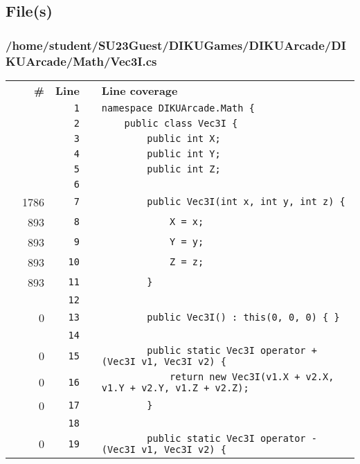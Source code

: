 \documentclass[a4paper,landscape,10pt]{article}
\begin{document}
\subsection{File(s)}
\subsubsection{/home/student/SU23Guest/DIKUGames/DIKUArcade/DIKUArcade/Math/Vec3I.cs}
\begin{longtable}[l]{lrrll}
\textbf{} & \textbf{\#} & \textbf{Line} & \textbf{} & \textbf{Line coverage}\\
\cellcolor{gray} &  & \verb~1~ & & \verb~namespace DIKUArcade.Math {~\\
\cellcolor{gray} &  & \verb~2~ & & \verb~    public class Vec3I {~\\
\cellcolor{gray} &  & \verb~3~ & & \verb~        public int X;~\\
\cellcolor{gray} &  & \verb~4~ & & \verb~        public int Y;~\\
\cellcolor{gray} &  & \verb~5~ & & \verb~        public int Z;~\\
\cellcolor{gray} &  & \verb~6~ & & \verb~~\\
\cellcolor{green} & 1786 & \verb~7~ & & \verb~        public Vec3I(int x, int y, int z) {~\\
\cellcolor{green} & 893 & \verb~8~ & & \verb~            X = x;~\\
\cellcolor{green} & 893 & \verb~9~ & & \verb~            Y = y;~\\
\cellcolor{green} & 893 & \verb~10~ & & \verb~            Z = z;~\\
\cellcolor{green} & 893 & \verb~11~ & & \verb~        }~\\
\cellcolor{gray} &  & \verb~12~ & & \verb~~\\
\cellcolor{red} & 0 & \verb~13~ & & \verb~        public Vec3I() : this(0, 0, 0) { }~\\
\cellcolor{gray} &  & \verb~14~ & & \verb~~\\
\cellcolor{red} & 0 & \verb~15~ & & \verb~        public static Vec3I operator +(Vec3I v1, Vec3I v2) {~\\
\cellcolor{red} & 0 & \verb~16~ & & \verb~            return new Vec3I(v1.X + v2.X, v1.Y + v2.Y, v1.Z + v2.Z);~\\
\cellcolor{red} & 0 & \verb~17~ & & \verb~        }~\\
\cellcolor{gray} &  & \verb~18~ & & \verb~~\\
\cellcolor{red} & 0 & \verb~19~ & & \verb~        public static Vec3I operator -(Vec3I v1, Vec3I v2) {~\\

\end{longtable}
\end{document}
